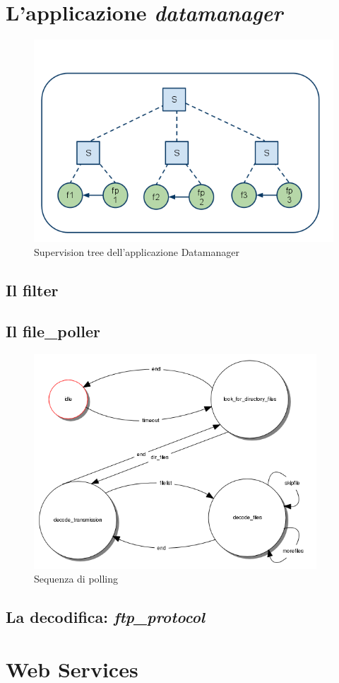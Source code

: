 %
\section{L'applicazione \emph{datamanager}}
%
\begin{figure}[!h]
\centering
\includegraphics[width=380pt]{img/datamanager.png}
\caption{Supervision tree dell'applicazione Datamanager}
\end{figure}
%
\subsection{Il filter}
\subsection{Il file\_poller}
%
\begin{figure}[!h]
\centering
\includegraphics[width=300pt]{img/file-poller.png}
\caption{Sequenza di polling}
\end{figure}
%
\subsection{La decodifica: \emph{ftp\_protocol}}

\section{Web Services}
